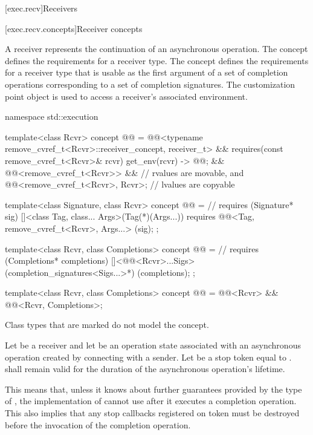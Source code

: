 [exec.recv]{Receivers}

[exec.recv.concepts]{Receiver concepts}

\pnum
A receiver represents the continuation of an asynchronous operation.
The  concept defines
the requirements for a receiver type.
The  concept defines
the requirements for a receiver type that is usable as
the first argument of a set of completion operations
corresponding to a set of completion signatures.
The  customization point object is used to access
a receiver's associated environment.
\begin{codeblock}
namespace std::execution {
  template<class Rcvr>
    concept @@ =
      @@<typename remove_cvref_t<Rcvr>::receiver_concept, receiver_t> &&
      requires(const remove_cvref_t<Rcvr>& rcvr) {
        { get_env(rcvr) } -> @@;
      } &&
      @@<remove_cvref_t<Rcvr>> &&       // rvalues are movable, and
      @@<remove_cvref_t<Rcvr>, Rcvr>;   // lvalues are copyable

  template<class Signature, class Rcvr>
    concept @@ =                 // \expos
      requires (Signature* sig) {
        []<class Tag, class... Args>(Tag(*)(Args...))
            requires @@<Tag, remove_cvref_t<Rcvr>, Args...>
        {}(sig);
      };

  template<class Rcvr, class Completions>
    concept @@ =                      // \expos
      requires (Completions* completions) {
        []<@@<Rcvr>...Sigs>(completion_signatures<Sigs...>*)
        {}(completions);
      };

  template<class Rcvr, class Completions>
    concept @@ =
      @@<Rcvr> && @@<Rcvr, Completions>;
}
\end{codeblock}

\pnum
Class types that are marked  do not model the  concept.

\pnum
Let  be a receiver and
let  be an operation state associated with
an asynchronous operation created by connecting  with a sender.
Let  be a stop token equal to
.
 shall remain valid
for the duration of the asynchronous operation's lifetime.
\begin{note}
This means that, unless it knows about further guarantees
provided by the type of ,
the implementation of  cannot use 
after it executes a completion operation.
This also implies that any stop callbacks registered on token
must be destroyed before the invocation of the completion operation.
\end{note}

